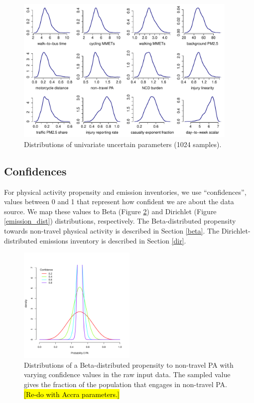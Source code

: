 \documentclass{article}
\begin{document}
\begin{figure}[h]
\centering
\includegraphics[width=0.95\textwidth]{uncertain_parameters.pdf}
\caption{\small Distributions of univariate uncertain parameters (1024 samples).}
\label{distributions}
\end{figure}

\subsection{Confidences}

For physical activity propensity and emission inventories, we use ``confidences'', values between 0 and 1 that represent how confident we are about the data source. We map these values to Beta (Figure \ref{prob_zero_PA}) and Dirichlet (Figure \ref{emission_dist}) distributions, respectively. The Beta-distributed propensity towards non-travel physical activity is described in Section \ref{beta}. The Dirichlet-distributed emissions inventory is described in Section \ref{dir}.


\begin{figure}[h]
\centering
\includegraphics[width=0.5\textwidth]{prob_zero_PA.pdf}
\caption{\small Distributions of a Beta-distributed propensity to non-travel PA with varying confidence values in the raw input data. The sampled value gives the fraction of the population that engages in non-travel PA. \hl{[Re-do with Accra parameters.]}}
\label{prob_zero_PA}
\end{figure}
\end{document}
